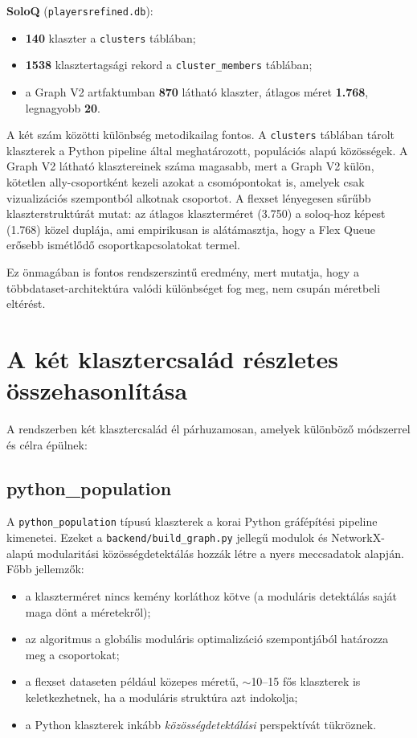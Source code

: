 ﻿\documentclass[a4paper,12pt]{report}
\begin{document}
\textbf{SoloQ} (\texttt{playersrefined.db}):
\begin{itemize}
    \item \textbf{140} klaszter a \texttt{clusters} táblában;
    \item \textbf{1538} klasztertagsági rekord a \texttt{cluster\_members} táblában;
    \item a Graph V2 artfaktumban \textbf{870} látható klaszter, átlagos méret \textbf{1.768}, legnagyobb \textbf{20}.
\end{itemize}

A két szám közötti különbség metodikailag fontos. A \texttt{clusters} táblában tárolt klaszterek a Python pipeline által meghatározott, populációs alapú közösségek. A Graph V2 látható klasztereinek száma magasabb, mert a Graph V2 külön, kötetlen ally-csoportként kezeli azokat a csomópontokat is, amelyek csak vizualizációs szempontból alkotnak csoportot. A flexset lényegesen sűrűbb klaszterstruktúrát mutat: az átlagos klaszterméret (3.750) a soloq-hoz képest (1.768) közel duplája, ami empirikusan is alátámasztja, hogy a Flex Queue erősebb ismétlődő csoportkapcsolatokat termel.

Ez önmagában is fontos rendszerszintű eredmény, mert mutatja, hogy a többdataset-architektúra valódi különbséget fog meg, nem csupán méretbeli eltérést.

\section{A két klasztercsalád részletes összehasonlítása}

A rendszerben két klasztercsalád él párhuzamosan, amelyek különböző módszerrel és célra épülnek:

\subsection{python\_population}

A \texttt{python\_population} típusú klaszterek a korai Python gráfépítési pipeline kimenetei. Ezeket a \texttt{backend/build\_graph.py} jellegű modulok és NetworkX-alapú modularitási közösségdetektálás hozzák létre a nyers meccsadatok alapján. Főbb jellemzők:

\begin{itemize}
    \item a klaszterméret nincs kemény korláthoz kötve (a moduláris detektálás saját maga dönt a méretekről);
    \item az algoritmus a globális moduláris optimalizáció szempontjából határozza meg a csoportokat;
    \item a flexset dataseten például közepes méretű, $\sim$10--15 fős klaszterek is keletkezhetnek, ha a moduláris struktúra azt indokolja;
    \item a Python klaszterek inkább \emph{közösségdetektálási} perspektívát tükröznek.
\end{itemize}
\end{document}
